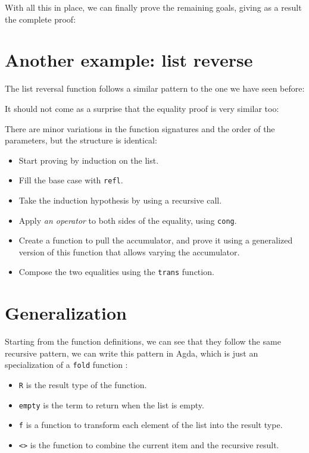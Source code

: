 \documentclass[runningheads]{llncs}
\begin{document}
With all this in place, we can finally prove the remaining goals, giving as a result the
complete proof:



\section{Another example: list reverse}

The list reversal function follows a similar pattern to the one we have seen before:



It should not come as a surprise that the equality proof is very similar too:



There are minor variations in the function signatures and the order of the parameters,
but the structure is identical:

\begin{itemize}
  \item Start proving by induction on the list.
  \item Fill the base case with \lstinline{refl}.
  \item Take the induction hypothesis by using a recursive call.
  \item Apply \emph{an operator} to both sides of the equality, using \lstinline{cong}.
  \item Create a function to pull the accumulator, and prove it using a generalized
        version of this function that allows varying the accumulator.
  \item Compose the two equalities using the \lstinline{trans} function.
\end{itemize}

\section{Generalization}

Starting from the function definitions, we can see that they follow the same recursive
pattern, we can write this pattern in Agda, which is just an specialization of a
\lstinline{fold} function \cite{hutton1999tutorial,meijer1991functional}:



\begin{itemize}
  \item \lstinline{R} is the result type of the function.
  \item \lstinline{empty} is the term to return when the list is empty.
  \item \lstinline{f} is a function to transform each element of the list into the result
        type.
  \item \lstinline{<>} is the function to combine the current item and the recursive
        result.
\end{itemize}
\end{document}

